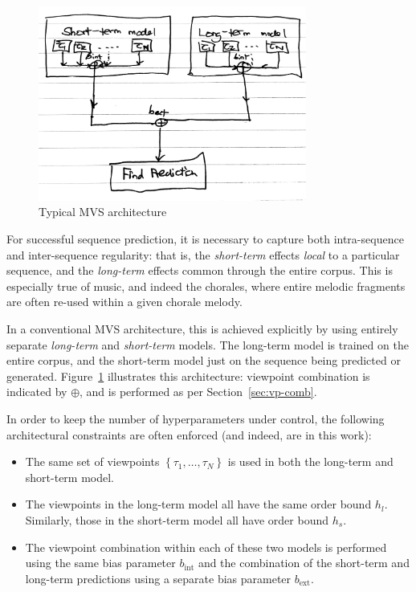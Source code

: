\documentclass[12pt,a4paper,twoside,openright]{report}
\newcommand{\set}[1]{ \left\{ #1 \right\} }
\begin{document}
\begin{figure}[H]
\centering
\includegraphics[width=250pt]{figs/mvs_arch_tmp.jpg}
\caption{Typical MVS architecture}
\label{fig:mvs-arch}
\end{figure}

For successful sequence prediction, it is necessary to capture both
intra-sequence and inter-sequence regularity: that is, the \emph{short-term}
effects \emph{local} to a particular sequence, and the \emph{long-term} effects
common through the entire corpus.  This is especially true of music, and indeed
the chorales, where entire melodic fragments are often re-used within a given
chorale melody.

In a conventional MVS architecture, this is achieved explicitly by using
entirely separate \emph{long-term} and \emph{short-term} models. The long-term
model is trained on the entire corpus, and the short-term model just on the
sequence being predicted or generated. Figure~\ref{fig:mvs-arch} illustrates
this architecture: viewpoint combination is indicated by $\oplus$, and is
performed as per Section~\ref{sec:vp-comb}.

In order to keep the number of hyperparameters under control, the following
architectural constraints are often enforced (and indeed, are in this work):
\begin{itemize}
  \item The same set of viewpoints $\set{\tau_1, \ldots, \tau_N}$ is used in both
    the long-term and short-term model. 
  \item The viewpoints in the long-term model all have the same order bound
    $h_l$. Similarly, those in the short-term model all have order bound $h_s$.
  \item The viewpoint combination within each of these two models is performed
    using the same bias parameter $b_{\mathrm{int}}$ and the combination of the
    short-term and long-term predictions using a separate bias parameter
    $b_{\mathrm{ext}}$.
\end{itemize}
\end{document}
